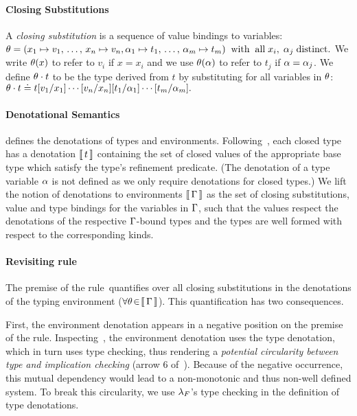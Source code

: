\paragraph{Closing Substitutions}
A \emph{closing substitution} is a sequence
of value bindings to variables:
$
    \clsub = (x_1\mapsto v_1,\,\ldots,\, x_n\mapsto v_n, \al_1 \mapsto t_1, \,\ldots,\, \al_m\mapsto t_m)
    \;\; {\rm with\;\; all}\; x_i,\; \al_j\; {\rm distinct.}
$
%
We write $\clsub(x)$ to refer to $v_i$ if $x = x_i$
and we use $\clsub(\al)$ to refer to $t_j$ if $\al = \al_j$.
%
We define $\applysubst{\clsub}{t}$ to be the type derived from $t$
by substituting for all variables in $\clsub$:
%
$
  \applysubst{\clsub}{t} \defeq \subst{t}{x_1}{v_1}\cdots\subst{}{x_n}{v_n}\subst{}{\al_1}{t_1}\cdots\subst{}{\al_m}{t_m}.
$
%


\paragraph{Denotational Semantics}
 defines the denotations of types and environments.
Following~\citet{flanagan06}, 
each closed type has a denotation $\denote{\stype}$
containing the set of closed values
of the appropriate base type
which satisfy the type's refinement
predicate.
(The denotation of a type variable $\al$
is not defined as we only require
denotations for closed types.)
%
We lift the notion of denotations to environments $\denote{\tcenv}$
as the set of closing substitutions, \ie value
and type bindings for the variables in $\tcenv$, such that the
values respect the denotations of the respective $\tcenv$-bound
types and the types are well formed with respect
to the corresponding kinds.


\paragraph{Revisiting rule~\iDen}
The premise of the rule~\iDen quantifies 
over all closing substitutions in the denotations of the 
typing environment 
(\ie $\forall \clsub\!\in\!\denote{\tcenv}$). 
This quantification has two consequences. 

First, the environment denotation appears in a negative position 
on the premise of the rule. Inspecting~, 
the environment denotation uses the type denotation, which in turn uses 
type checking, thus rendering a \textit{potential circularity
between type and implication checking} (arrow 6 of~). 
Because of the negative occurrence, this mutual dependency 
would lead to a non-monotonic and thus non-well defined system. 
To break this circularity, we use $\sysf$'s type checking in the definition 
of type denotations. 

